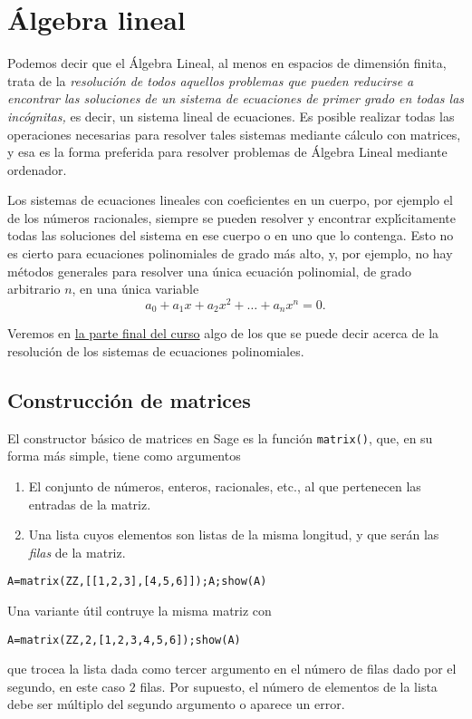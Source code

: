 \section{\'Algebra lineal}



Podemos decir que el \'Algebra Lineal, al menos en espacios de dimensi\'on
finita,  trata de la {\itshape resoluci\'on de todos aquellos problemas que
pueden reducirse a encontrar las soluciones de un sistema de ecuaciones de
primer grado en todas las inc\'ognitas,} es decir, un sistema lineal de
ecuaciones.  Es posible realizar todas las operaciones necesarias para resolver
tales sistemas mediante c\'alculo con matrices, y esa es la forma preferida para
resolver problemas de \'Algebra Lineal mediante ordenador.

Los sistemas de  ecuaciones lineales con coeficientes en un cuerpo, por ejemplo
el de los n\'umeros racionales, siempre se pueden resolver y encontrar
expl\'{\i}citamente todas las soluciones del sistema en ese cuerpo o en uno que
lo contenga.  Esto no es cierto para ecuaciones polinomiales de grado m\'as
alto, y, por ejemplo, no hay m\'etodos generales para resolver una \'unica
ecuaci\'on  polinomial, de grado arbitrario $n$,  en una \'unica variable
\[a_0+a_1x+a_2x^2+\dots+a_nx^n=0.\]

Veremos en \hyperref[grobner]{la parte final del curso} algo de los que se puede
decir acerca de la resoluci\'on de los sistemas de ecuaciones polinomiales. 

\subsection{Construcción de matrices}
El constructor básico de matrices en Sage es la función \lstinline|matrix()|,
que,  en su forma m\'as simple, tiene como argumentos 
\begin{enumerate}
 \item El conjunto de n\'umeros, enteros, racionales, etc.,  al que pertenecen
las entradas de la matriz. 
 \item Una lista cuyos elementos son listas de la misma longitud,  y que ser\'an
las {\itshape filas} de la matriz.
\end{enumerate}
\begin{lstlisting}
A=matrix(ZZ,[[1,2,3],[4,5,6]]);A;show(A)
\end{lstlisting}

Una variante \'util contruye la misma matriz con 
\begin{lstlisting}
A=matrix(ZZ,2,[1,2,3,4,5,6]);show(A)
\end{lstlisting}
\noindent que trocea la lista dada como tercer argumento en el n\'umero de filas
dado por el segundo, en este caso $2$ filas. Por supuesto,  el n\'umero de
elementos de la lista debe ser m\'ultiplo del segundo argumento o aparece un
error. 

